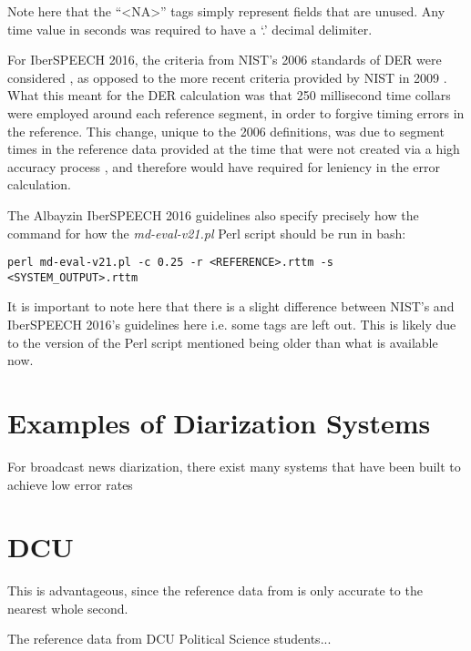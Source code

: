 \doublespacing
\noindent Note here that the ``{\small <NA>}'' tags simply represent fields that are unused. Any time value in seconds was required to have a `.' decimal delimiter. \par
For IberSPEECH 2016, the criteria from NIST's 2006 standards of DER were considered \cite{NIST2006web}, as opposed to the more recent criteria provided by NIST in 2009 \cite{NIST2009web}. What this meant for the DER calculation was that 250 millisecond time collars were employed around each reference segment, in order to forgive timing errors in the reference. This change, unique to the 2006 definitions, was due to segment times in the reference data provided at the time that were not created via a high accuracy process \cite{NIST2006web}, and therefore would have required for leniency in the error calculation. \par
The Albayzin IberSPEECH 2016 guidelines also specify precisely how the command for how the \emph{md-eval-v21.pl} Perl script should be run in bash:

\begin{lstlisting}
perl md-eval-v21.pl -c 0.25 -r <REFERENCE>.rttm -s <SYSTEM_OUTPUT>.rttm
\end{lstlisting}

\noindent It is important to note here that there is a slight difference between NIST's and IberSPEECH 2016's guidelines here i.e. some tags are left out. This is likely due to the version of the Perl script mentioned being older than what is available now.

\singlespacing
\section{Examples of Diarization Systems}

\doublespacing
For broadcast news diarization, there exist many systems that have been built to achieve low error rates

\singlespacing
\section{DCU}

\doublespacing
This is advantageous, since the reference data from \cite{DCUref} is only accurate to the nearest whole second. \par
\cite{DCUref} The reference data from DCU Political Science students...

